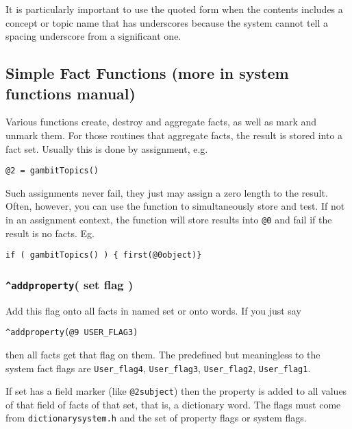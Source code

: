 \documentclass[]{article}
\begin{document}
It is particularly important to use the quoted form when the contents
includes a concept or topic name that has underscores because the system
cannot tell a spacing underscore from a significant one.

\subsection{Simple Fact Functions (more in system functions
manual)}\label{simple-fact-functions-more-in-system-functions-manual}

Various functions create, destroy and aggregate facts, as well as mark
and unmark them. For those routines that aggregate facts, the result is
stored into a fact set. Usually this is done by assignment, e.g.

\begin{verbatim}
@2 = gambitTopics()
\end{verbatim}

Such assignments never fail, they just may assign a zero length to the
result. Often, however, you can use the function to simultaneously store
and test. If not in an assignment context, the function will store
results into \texttt{@0} and fail if the result is no facts. Eg.

\begin{verbatim}
if ( gambitTopics() ) { first(@0object)}
\end{verbatim}

\subsubsection{\texorpdfstring{\texttt{\^{}addproperty}( set flag
)}{\^{}addproperty( set flag )}}\label{addproperty-set-flag}

Add this flag onto all facts in named set or onto words. If you just say

\begin{verbatim}
^addproperty(@9 USER_FLAG3) 
\end{verbatim}

then all facts get that flag on them. The predefined but meaningless to
the system fact flags are \texttt{User\_flag4}, \texttt{User\_flag3},
\texttt{User\_flag2}, \texttt{User\_flag1}.

If set has a field marker (like \texttt{@2subject}) then the property is
added to all values of that field of facts of that set, that is, a
dictionary word. The flags must come from \texttt{dictionarysystem.h}
and the set of property flags or system flags.
\end{document}
